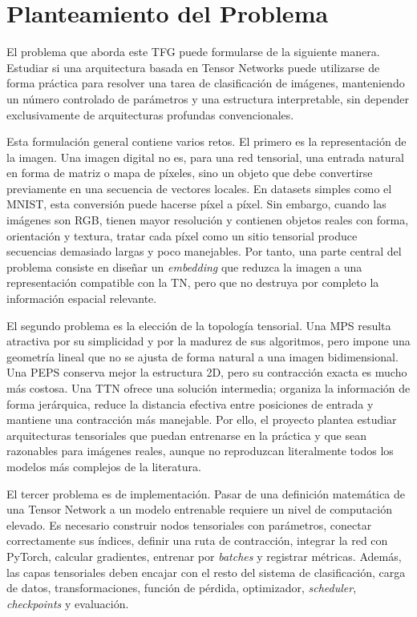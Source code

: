 \section{Planteamiento del Problema}

El problema que aborda este TFG puede formularse de la siguiente manera. Estudiar si una arquitectura basada en Tensor Networks puede utilizarse de forma práctica para resolver una tarea de clasificación de imágenes, manteniendo un número controlado de parámetros y una estructura interpretable, sin depender exclusivamente de arquitecturas profundas convencionales.

Esta formulación general contiene varios retos. El primero es la representación de la imagen. Una imagen digital no es, para una red tensorial, una entrada natural en forma de matriz o mapa de píxeles, sino un objeto que debe convertirse previamente en una secuencia de vectores locales. En datasets simples como el MNIST, esta conversión puede hacerse píxel a píxel. Sin embargo, cuando las imágenes son RGB, tienen mayor resolución y contienen objetos reales con forma, orientación y textura, tratar cada píxel como un sitio tensorial produce secuencias demasiado largas y poco manejables. Por tanto, una parte central del problema consiste en diseñar un \textit{embedding} que reduzca la imagen a una representación compatible con la TN, pero que no destruya por completo la información espacial relevante.

El segundo problema es la elección de la topología tensorial. Una MPS resulta atractiva por su simplicidad y por la madurez de sus algoritmos, pero impone una geometría lineal que no se ajusta de forma natural a una imagen bidimensional. Una PEPS conserva mejor la estructura 2D, pero su contracción exacta es mucho más costosa. Una TTN ofrece una solución intermedia; organiza la información de forma jerárquica, reduce la distancia efectiva entre posiciones de entrada y mantiene una contracción más manejable. Por ello, el proyecto plantea estudiar arquitecturas tensoriales que puedan entrenarse en la práctica y que sean razonables para imágenes reales, aunque no reproduzcan literalmente todos los modelos más complejos de la literatura.

El tercer problema es de implementación. Pasar de una definición matemática de una Tensor Network a un modelo entrenable requiere un nivel de computación elevado. Es necesario construir nodos tensoriales con parámetros, conectar correctamente sus índices, definir una ruta de contracción, integrar la red con PyTorch, calcular gradientes, entrenar por \textit{batches} y registrar métricas. Además, las capas tensoriales deben encajar con el resto del sistema de clasificación, carga de datos, transformaciones, función de pérdida, optimizador, \textit{scheduler}, \textit{checkpoints} y evaluación.

